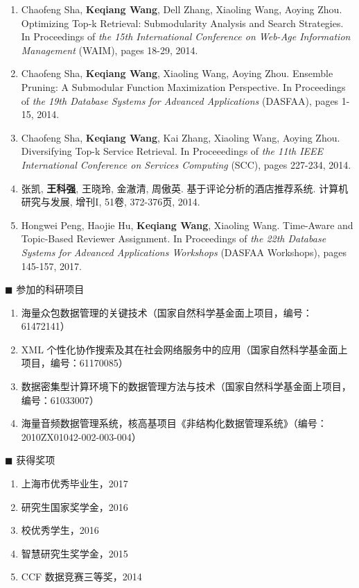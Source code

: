 \begin{enumerate}
	\item Chaofeng Sha, \textbf{Keqiang Wang}, Dell Zhang, Xiaoling Wang, Aoying Zhou. Optimizing Top-k Retrieval: Submodularity Analysis and Search Strategies. In Proceedings of \textit{the 15th International Conference on Web-Age Information Management} (WAIM), pages 18-29, 2014.
	
	\item Chaofeng Sha, \textbf{Keqiang Wang}, Xiaoling Wang, Aoying Zhou. Ensemble Pruning: A Submodular Function Maximization Perspective.  In Proceedings of \textit{the 19th Database Systems for Advanced Applications} (DASFAA), pages 1-15, 2014.
	
	\item Chaofeng Sha, \textbf{Keqiang Wang}, Kai Zhang, Xiaoling Wang, Aoying Zhou. Diversifying Top-k Service Retrieval. In Proceeedings of \textit{the 11th IEEE International Conference on Services Computing} (SCC), pages 227-234, 2014.
	
	\item 张凯, \textbf{王科强}, 王晓玲, 金澈清, 周傲英. 基于评论分析的酒店推荐系统. 计算机研究与发展, 增刊I, 51卷, 372-376页, 2014.

	\item Hongwei Peng, Haojie Hu, \textbf{Keqiang Wang}, Xiaoling Wang.
	Time-Aware and Topic-Based Reviewer Assignment.  In Proceedings of \textit{the 22th Database Systems for Advanced Applications Workshops} (DASFAA Workshops), pages 145-157, 2017.
\end{enumerate}

{\heiti $\blacksquare$ 参加的科研项目}
\begin{enumerate}
	\renewcommand{\labelenumi}{[\theenumi]}
	\renewcommand\baselinestretch{1}\selectfont 	
	
	\item 海量众包数据管理的关键技术（国家自然科学基金面上项目，编号：61472141）
	
	\item XML 个性化协作搜索及其在社会网络服务中的应用（国家自然科学基金面上项目，编号：61170085）
	
	\item 数据密集型计算环境下的数据管理方法与技术（国家自然科学基金面上项目，编号：61033007）
	
	\item 海量音频数据管理系统，核高基项目《非结构化数据管理系统》（编号：2010ZX01042-002-003-004）

\end{enumerate}
{\heiti $\blacksquare$ 获得奖项}
\begin{enumerate}
	\renewcommand{\labelenumi}{[\theenumi]}
	\renewcommand\baselinestretch{1}\selectfont 	
	\item 上海市优秀毕业生，2017
	\item  研究生国家奖学金，2016
	\item 校优秀学生，2016
	\item 智慧研究生奖学金，2015
	\item CCF 数据竞赛三等奖，2014
\end{enumerate}